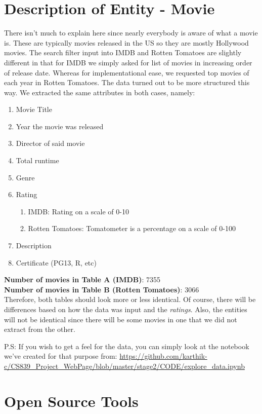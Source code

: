 \documentclass[]{article}
\begin{document}
\section{Description of Entity - Movie}
There isn't much to explain here since nearly everybody is aware of what a movie is. These are typically movies released in the US so they are mostly Hollywood movies. The search filter input into IMDB and Rotten Tomatoes are slightly different in that for IMDB we simply asked for list of movies in increasing order of release date. Whereas for implementational ease, we requested top movies of each year in Rotten Tomatoes. The data turned out to be more structured this way.
We extracted the same attributes in both cases, namely:
\begin{enumerate}
\item Movie Title
\item Year the movie was released
\item Director of said movie
\item Total runtime
\item Genre
\item Rating
\begin{enumerate}
	\item IMDB: Rating on a scale of 0-10
	\item Rotten Tomatoes: Tomatometer is a percentage on a scale of 0-100
\end{enumerate}
\item Description
\item Certificate (PG13, R, etc)
\end{enumerate}

\vspace{2mm}
\textbf{Number of movies in Table A  (IMDB)}:  7355\\

\textbf{Number of movies in Table B  (Rotten Tomatoes)}:  3066\\

Therefore, both tables should look more or less identical. Of course, there will be differences based on how the data was input and the \textit{ratings}. Also, the entities will not be identical since there will be some movies in one that we did not extract from the other.

P.S: If you wish to get a feel for the data, you can simply look at the notebook we've created for that purpose from: \url{https://github.com/karthik-c/CS839_Project_WebPage/blob/master/stage2/CODE/explore_data.ipynb}

\section{Open Source Tools}
\end{document}
